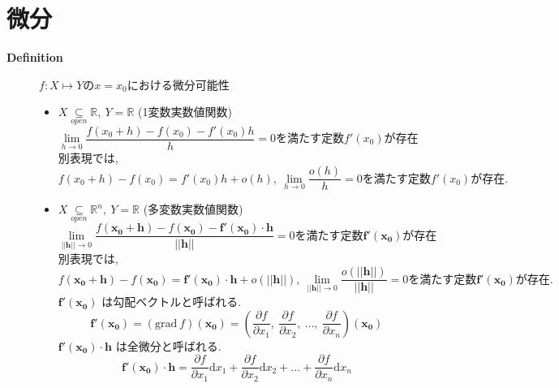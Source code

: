 \documentclass[dvipdfmx]{jsarticle}
\begin{document}
\section{微分}
        \begin{description}
            \item[\bf{Definition}] $f: X \mapsto Y$の$x=x_0$における微分可能性
                \begin{itemize}
                    \item $X \underset{open}{\subseteq} \mathbb{R},\ Y = \mathbb{R}$ (1変数実数値関数)
                        $$ \lim_{h \to 0} \dfrac{f(x_0 + h) - f(x_0) - f'(x_0)h }{h} = 0 \text{を満たす定数} f'(x_0) \text{が存在}$$
                        別表現では, 
                        $$f(x_0 + h) - f(x_0) = f'(x_0)h + o(h),\ \displaystyle \lim_{h \to 0} \dfrac{o(h)}{h} = 0 \text{を満たす定数} f'(x_0) \text{が存在.}$$
                        
                    \item $X \underset{open}{\subseteq} \mathbb{R}^n,\ Y = \mathbb{R}$ (多変数実数値関数)
                        $$ \lim_{||\bm{h}|| \to 0} \dfrac{f(\bm{x_0} + \bm{h}) - f(\bm{x_0}) - \bm{f'}(\bm{x_0}) \cdot \bm{h} }{||\bm{h}||} = 0 \text{を満たす定数} \bm{f'}(\bm{x_0}) \text{が存在}$$
                        別表現では, 
                        $$f(\bm{x_0} + \bm{h}) - f(\bm{x_0}) = \bm{f'}(\bm{x_0}) \cdot \bm{h} + o(||\bm{h}||),\ \displaystyle \lim_{||\bm{h}|| \to 0} \dfrac{o(||\bm{h}||)}{||\bm{h}||} = 0 \text{を満たす定数} \bm{f'}(\bm{x_0}) \text{が存在.}$$
                        $\bm{f'}(\bm{x_0})$ は勾配ベクトルと呼ばれる.
                        $$\bm{f'}(\bm{x_0}) = (\mathrm{grad} \ f)(\bm{x_0}) = ( \frac{\partial f}{\partial x_1},\ \frac{\partial f}{\partial x_2},\ \dots  ,\ \frac{\partial f}{\partial x_n} )(\bm{x_0}) $$
                        $\bm{f'}(\bm{x_0}) \cdot \bm{h}$ は全微分と呼ばれる.
                        $$\bm{f'}(\bm{x_0}) \cdot \bm{h} = \frac{\partial f}{\partial x_1} \mathrm{d} x_1 + \frac{\partial f}{\partial x_2} \mathrm{d} x_2 + \dots + \frac{\partial f}{\partial x_n} \mathrm{d} x_n $$
                        

\end{itemize}
\end{description}
\end{document}
